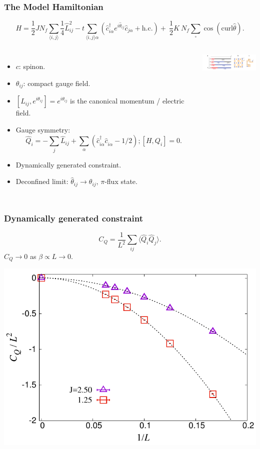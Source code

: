 \documentclass[xcolor=table, 10pt, aspectratio=43]{beamer}
\begin{document}
\begin{frame}
  \frametitle{The Model Hamiltonian}
  \[
  H=\frac{1}{2}JN_{f}\sum_{\langle i,j \rangle} \frac 1 4 \hat{L}^{2}_{ij}-t\sum_{\langle i,j \rangle\alpha}\left(\hat{c}^{\dagger}_{i\alpha}e^{i\hat{\theta}_{ij}}\hat{c}_{j\alpha}+\text{h.c.}\right)
  +\ \frac{1}{2}K\ N_f\sum_{\square}\cos \left( \text{curl} \hat{\theta} \right).
\]
\begin{columns}
  \begin{itemize}
    \item $c$: spinon.
    \item $\theta_{ij}$: compact gauge field.
    \item $[L_{ij}, e^{i\theta_{ij}}]=e^{i\theta_{ij}}$ is the canonical momentum / electric field.
    \item Gauge symmetry:
    \[\hat{Q}_{i} = -\sum_{j}\hat{L}_{ij} + \sum_{\alpha} \left( \hat{c}^{\dagger}_{i\alpha}\hat{c}^{\phantom\dagger}_{i\alpha} - 1/2 \right);[H, Q_i] = 0.\]
    \item Dynamically generated constraint.
    \item Deconfined limit: $\hat\theta_{ij}\rightarrow \theta_{ij}$, $\pi$-flux state.
  \end{itemize}

  \begin{center}
    \includegraphics[width=3cm]{model}
  \end{center}
\end{columns}
\end{frame}

\begin{frame}
  \frametitle{Dynamically generated constraint}
  \[C_{Q} = \frac{1}{L^2} \sum_{ij} \langle \hat{Q}_i \hat{Q}_j\rangle.\]
  $C_Q\rightarrow0$ as $\beta\propto L\rightarrow0$.
  \begin{center}
    \includegraphics[width=.8\textwidth]{n2QQ00}
  \end{center}
\end{frame}
\end{document}
